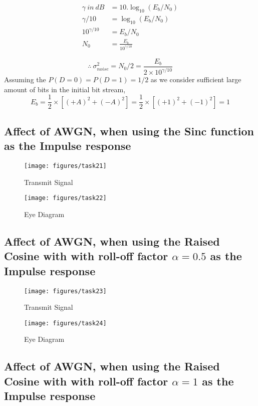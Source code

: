 \documentclass[a4paper,11pt]{article}%
\begin{document}
\[
\begin{split}
	\gamma~in~dB &= 10.\log_{10}(E_b/N_0)\\
	\gamma/10 &= \log_{10}(E_b/N_0)\\
	10^{\gamma/10} &= E_b/N_0\\
	N_0 &= \frac{E_b}{10^{\gamma/10}}
\end{split}
\]

\[\therefore ~\sigma_{noise}^2 = N_0/2 = \frac{E_b}{2 \times 10^{\gamma/10}}  \]
Assuming the $P(D = 0) = P(D = 1) = 1/2$ as we consider sufficient large amount of bits in the initial bit stream,
\[
E_b = \frac{1}{2} \times \left[ (+A)^2 + (-A)^2 \right]
 = \frac{1}{2} \times \left[ (+1)^2 + (-1)^2 \right]
 = 1
\]
\pagebreak
\subsection{Affect of AWGN, when using the Sinc function as the Impulse response}

\begin{figure}[H]
	\centering
	\texttt{[image: figures/task21]}
	\caption{Transmit Signal}
\end{figure}

\begin{figure}[H]
	\centering
	\texttt{[image: figures/task22]}
	\caption{Eye Diagram}
\end{figure}

\pagebreak
\subsection{Affect of AWGN, when using the Raised Cosine with with roll-off factor $\alpha = 0.5$ as the Impulse response}

\begin{figure}[H]
	\centering
	\texttt{[image: figures/task23]}
	\caption{Transmit Signal}
\end{figure}

\begin{figure}[H]
	\centering
	\texttt{[image: figures/task24]}
	\caption{Eye Diagram}
\end{figure}


\pagebreak
\subsection{Affect of AWGN, when using the Raised Cosine with with roll-off factor $\alpha = 1$ as the Impulse response}
\end{document}
